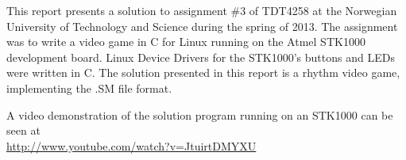 This report presents a solution to assignment \#3 of TDT4258 at the Norwegian University of Technology and Science during the spring of 2013.
The assignment was to write a video game in C for Linux running on the Atmel STK1000 development board.
Linux Device Drivers for the STK1000's buttons and LEDs were written in C.
The solution presented in this report is a rhythm video game, implementing the .SM file format.

\bigskip
\bigskip

\begin{center}
A video demonstration of the solution program running on an STK1000 can be seen at \\
\url{http://www.youtube.com/watch?v=JtuirtDMYXU}
\end{center}
